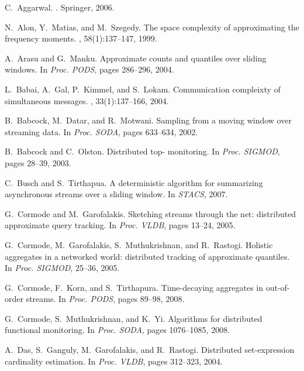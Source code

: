 \documentclass[proceedings]{stacs}
\theoremstyle{definition}\newtheorem{fact}{Fact}
\begin{document}

\begin{thebibliography}{10}
\small


C.~Aggarwal.
.
\newblock Springer, 2006.

N.~Alon, Y.~Matias, and M.~Szegedy.
\newblock The space complexity of approximating the frequency moments.
, 58(1):137--147, 1999.

A.~Arasu and G.~Manku.
\newblock Approximate counts and quantiles over sliding windows.
\newblock In {\em Proc. PODS}, pages 286--296, 2004.

L.~Babai, A.~Gal, P.~Kimmel, and S.~Lokam.
\newblock Communication compleixty of simultaneous messages.
, 33(1):137--166, 2004.

B.~Babcock, M.~Datar, and R.~Motwani.
\newblock Sampling from a moving window over streaming data.
\newblock In {\em Proc. SODA}, pages 633--634, 2002.

B.~Babcock and C.~Olston.
\newblock Distributed top- monitoring.
\newblock In {\em Proc. SIGMOD}, pages 28--39, 2003.

C.~Busch and S.~Tirthapua.
\newblock A deterministic algorithm for summarizing asynchronous streams over a
  sliding window.
\newblock In {\em STACS}, 2007.

G.~Cormode and M.~Garofalakis.
\newblock Sketching streams through the net: distributed approximate query
  tracking.
\newblock In {\em Proc. VLDB}, pages 13--24, 2005.

G.~Cormode, M.~Garofalakis, S.~Muthukrishnan, and R.~Rastogi.
\newblock Holistic aggregates in a networked world: distributed tracking of
  approximate quantiles.
\newblock In {\em Proc. SIGMOD}, 25--36, 2005.

G.~Cormode, F.~Korn, and S.~Tirthapura.
\newblock Time-decaying aggregates in out-of-order streams.
\newblock In {\em Proc. PODS}, pages 89--98, 2008.

G.~Cormode, S.~Muthukrishnan, and K.~Yi.
\newblock Algorithms for distributed functional monitoring.
\newblock In {\em Proc. SODA}, pages 1076--1085, 2008.

A.~Das, S.~Ganguly, M.~Garofalakis, and R.~Rastogi.
\newblock Distributed set-expression cardinality estimation.
\newblock In {\em Proc. VLDB}, pages 312--323, 2004.


\end{thebibliography}
\end{document}
